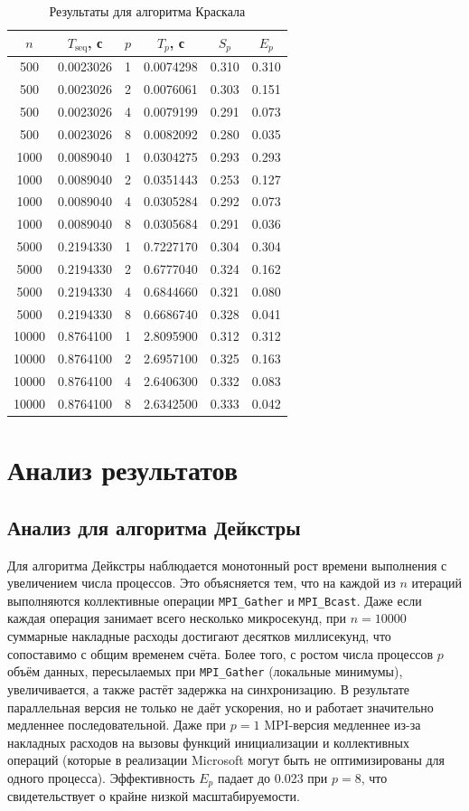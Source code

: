 \documentclass[14pt,a4paper]{article}
\begin{document}
\begin{table}[H]
\centering
\caption{Результаты для алгоритма Краскала}
\label{tab:kruskal}
\begin{tabular}{|c|c|c|c|c|c|}
\hline
$n$ & $T_{\text{seq}}$, с & $p$ & $T_p$, с & $S_p$ & $E_p$ \\
\hline
500 & 0.0023026 & 1 & 0.0074298 & 0.310 & 0.310 \\
500 & 0.0023026 & 2 & 0.0076061 & 0.303 & 0.151 \\
500 & 0.0023026 & 4 & 0.0079199 & 0.291 & 0.073 \\
500 & 0.0023026 & 8 & 0.0082092 & 0.280 & 0.035 \\
\hline
1000 & 0.0089040 & 1 & 0.0304275 & 0.293 & 0.293 \\
1000 & 0.0089040 & 2 & 0.0351443 & 0.253 & 0.127 \\
1000 & 0.0089040 & 4 & 0.0305284 & 0.292 & 0.073 \\
1000 & 0.0089040 & 8 & 0.0305684 & 0.291 & 0.036 \\
\hline
5000 & 0.2194330 & 1 & 0.7227170 & 0.304 & 0.304 \\
5000 & 0.2194330 & 2 & 0.6777040 & 0.324 & 0.162 \\
5000 & 0.2194330 & 4 & 0.6844660 & 0.321 & 0.080 \\
5000 & 0.2194330 & 8 & 0.6686740 & 0.328 & 0.041 \\
\hline
10000 & 0.8764100 & 1 & 2.8095900 & 0.312 & 0.312 \\
10000 & 0.8764100 & 2 & 2.6957100 & 0.325 & 0.163 \\
10000 & 0.8764100 & 4 & 2.6406300 & 0.332 & 0.083 \\
10000 & 0.8764100 & 8 & 2.6342500 & 0.333 & 0.042 \\
\hline
\end{tabular}
\end{table}

\section{Анализ результатов}
\subsection{Анализ для алгоритма Дейкстры}
Для алгоритма Дейкстры наблюдается монотонный рост времени выполнения с увеличением числа процессов. Это объясняется тем, что на каждой из $n$ итераций выполняются коллективные операции \texttt{MPI\_Gather} и \texttt{MPI\_Bcast}. Даже если каждая операция занимает всего несколько микросекунд, при $n=10000$ суммарные накладные расходы достигают десятков миллисекунд, что сопоставимо с общим временем счёта. Более того, с ростом числа процессов $p$ объём данных, пересылаемых при \texttt{MPI\_Gather} (локальные минимумы), увеличивается, а также растёт задержка на синхронизацию. В результате параллельная версия не только не даёт ускорения, но и работает значительно медленнее последовательной. Даже при $p=1$ MPI-версия медленнее из-за накладных расходов на вызовы функций инициализации и коллективных операций (которые в реализации Microsoft могут быть не оптимизированы для одного процесса). Эффективность $E_p$ падает до 0.023 при $p=8$, что свидетельствует о крайне низкой масштабируемости.
\end{document}
